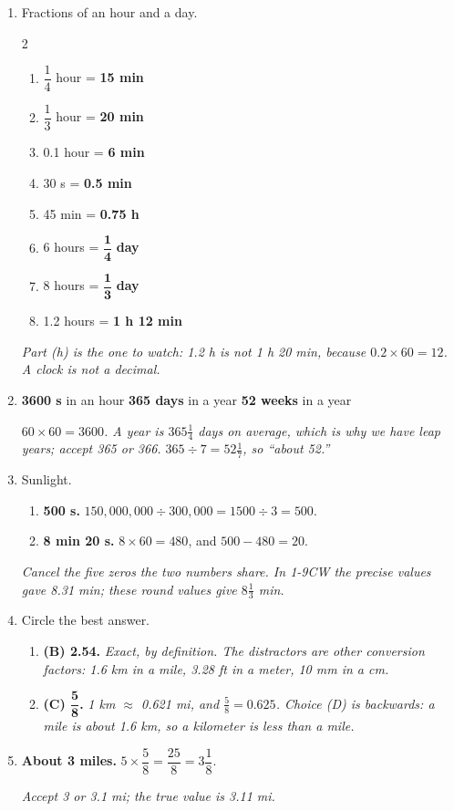 \documentclass[12pt, twoside]{article}
\begin{document}
\begin{enumerate}[itemsep=0.45cm]
\item Fractions of an hour and a day.
  \begin{multicols}{2}
    \begin{enumerate}[itemsep=0.2cm]
      \item $\dfrac{1}{4}$ hour = \textbf{15 min}
      \item $\dfrac{1}{3}$ hour = \textbf{20 min}
      \item 0.1 hour = \textbf{6 min}
      \item 30 s = \textbf{0.5 min}
      \item 45 min = \textbf{0.75 h}
      \item 6 hours = $\mathbf{\dfrac{1}{4}}$ \textbf{day}
      \item 8 hours = $\mathbf{\dfrac{1}{3}}$ \textbf{day}
      \item 1.2 hours = \textbf{1 h 12 min}
    \end{enumerate}
  \end{multicols}
  \emph{Part (h) is the one to watch: 1.2 h is not 1 h 20 min, because
  $0.2 \times 60 = 12$. A clock is not a decimal.}

\item \textbf{3600 s} in an hour \quad \textbf{365 days} in a year \quad
  \textbf{52 weeks} in a year

  \emph{$60 \times 60 = 3600$. A year is $365\frac{1}{4}$ days on average, which is
  why we have leap years; accept 365 or 366. $365 \div 7 = 52\frac{1}{7}$, so
  ``about 52.''}

\item Sunlight.
  \begin{enumerate}[itemsep=0.2cm]
    \item \textbf{500 s.} \quad
      $150{,}000{,}000 \div 300{,}000 = 1500 \div 3 = 500$.
    \item \textbf{8 min 20 s.} \quad $8 \times 60 = 480$, and $500 - 480 = 20$.
  \end{enumerate}
  \emph{Cancel the five zeros the two numbers share. In 1-9CW the precise values gave
  8.31 min; these round values give $8\frac{1}{3}$ min.}

\item Circle the best answer.
  \begin{enumerate}[itemsep=0.2cm]
    \item \textbf{(B) 2.54.} \emph{Exact, by definition. The distractors are
      other conversion factors: 1.6 km in a mile, 3.28 ft in a meter, 10 mm in a cm.}
    \item \textbf{(C) $\mathbf{\dfrac{5}{8}}$.} \emph{1 km $\approx$ 0.621 mi, and
      $\frac{5}{8} = 0.625$. Choice (D) is backwards: a mile is about 1.6 km, so a
      kilometer is less than a mile.}
  \end{enumerate}

\item \textbf{About 3 miles.} \quad
  $5 \times \dfrac{5}{8} = \dfrac{25}{8} = 3\dfrac{1}{8}$.

  \emph{Accept 3 or 3.1 mi; the true value is 3.11 mi.}

\end{enumerate}
\end{document}
